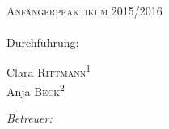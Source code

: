 \begin{titlepage}
	\par
	\hfill
	\par
\begin{center}
\ \\
[6cm]	
	\textsc{\Huge Anfängerpraktikum 2015/2016} \\
[2cm]
	\Huge\textbf{\Versuch} \\
[1cm]
	{\large Durchführung: \Tag} \\
[5cm]
\begin{minipage}{0.4\textwidth}
	\begin{flushleft} \large
		Clara \textsc{Rittmann}\textsuperscript{1} \\
		Anja \textsc{Beck}\textsuperscript{2}
	\end{flushleft}
\end{minipage}
\hfill
\begin{minipage}{0.4\textwidth}
	\begin{flushright} \large
		\emph{Betreuer:} \\
		\Betreuer
	\end{flushright}
\end{minipage}
\end{center}
\end{titlepage}